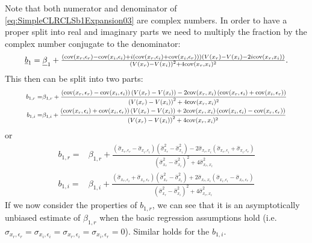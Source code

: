 \documentclass[
]{book}
\begin{document}
Note that both numerator and denominator of \eqref{eq:SimpleCLRCLSb1Expansion03} are complex numbers. In order to have a proper split into real and imaginary parts we need to multiply the fraction by the complex number conjugate to the denominator:
\begin{equation}
\resizebox{0.9\textwidth}{!}{$
        \underline{b}_1 = \underline{\beta}_1 + \frac{\left(\mathrm{cov}(x_r, \epsilon_r) - \mathrm{cov}(x_i, \epsilon_i) + i (\mathrm{cov}(x_r, \epsilon_i) + \mathrm{cov}(x_i, \epsilon_r))\right)\left(V(x_r) - V(x_i) - 2i \mathrm{cov}(x_r, x_i)\right)}{\left(V(x_r) - V(x_i)\right)^2 + 4 \mathrm{cov}(x_r, x_i)^2} $}.
    \label{eq:SimpleCLRCLSb1Expansion04}
\end{equation}
This then can be split into two parts:
\begin{equation}
\resizebox{0.9\textwidth}{!}{$
    \begin{aligned}
        b_{1,r} = & \beta_{1,r} + \frac{\left(\mathrm{cov}(x_r, \epsilon_r) - \mathrm{cov}(x_i, \epsilon_i)\right) \left(V(x_r) - V(x_i)\right) - 2 \mathrm{cov}(x_r, x_i) \left(\mathrm{cov}(x_r, \epsilon_i) + \mathrm{cov}(x_i, \epsilon_r)\right)}{\left(V(x_r) - V(x_i)\right)^2 + 4 \mathrm{cov}(x_r, x_i)^2} \\
        b_{1,i} = & \beta_{1,i} + \frac{\left( \mathrm{cov}(x_r, \epsilon_i) + \mathrm{cov}(x_i, \epsilon_r)\right)\left(V(x_r) - V(x_i) \right) + 2 \mathrm{cov}(x_r, x_i) \left(\mathrm{cov}(x_i, \epsilon_i) - \mathrm{cov}(x_r, \epsilon_r)\right)}{\left(V(x_r) - V(x_i)\right)^2 + 4 \mathrm{cov}(x_r, x_i)^2} 
    \end{aligned}$}
    \label{eq:SimpleCLRCLSb1Expansion05}
\end{equation}
or
\begin{equation}
    \begin{aligned}
        b_{1,r} = & \beta_{1,r} + \frac{\left(\hat{\sigma}_{x_r, \epsilon_r} - \hat{\sigma}_{x_i, \epsilon_i}\right) \left(\hat{\sigma}_{x_r}^2 - \hat{\sigma}_{x_i}^2 \right) - 2 \hat{\sigma}_{x_r, x_i} \left(\hat{\sigma}_{x_r, \epsilon_i} + \hat{\sigma}_{x_i, \epsilon_r}\right)}{\left(\hat{\sigma}_{x_r}^2 - \hat{\sigma}_{x_i}^2\right)^2 + 4 \hat{\sigma}_{x_r, x_i}^2} \\
        b_{1,i} = & \beta_{1,i} + \frac{\left( \hat{\sigma}_{x_r, \epsilon_i} + \hat{\sigma}_{x_i, \epsilon_r}\right)\left(\hat{\sigma}_{x_r}^2 - \hat{\sigma}_{x_i}^2 \right) + 2 \hat{\sigma}_{x_r, x_i} \left(\hat{\sigma}_{x_i, \epsilon_i} - \hat{\sigma}_{x_r, \epsilon_r}\right)}{\left(\hat{\sigma}_{x_r}^2 - \hat{\sigma}_{x_i}^2\right)^2 + 4 \hat{\sigma}_{x_r, x_i}^2}
    \end{aligned}
    \label{eq:SimpleCLRCLSb1Expansion06}
\end{equation}
If we now consider the properties of \(b_{1,r}\), we can see that it is an asymptotically unbiased estimate of \(\beta_{1,r}\) when the basic regression assumptions hold (i.e.~\({\sigma}_{x_r, \epsilon_r} = {\sigma}_{x_i, \epsilon_i} = {\sigma}_{x_r, \epsilon_i} = {\sigma}_{x_i, \epsilon_r}=0\)). Similar holds for the \(b_{1,i}\).
\end{document}
